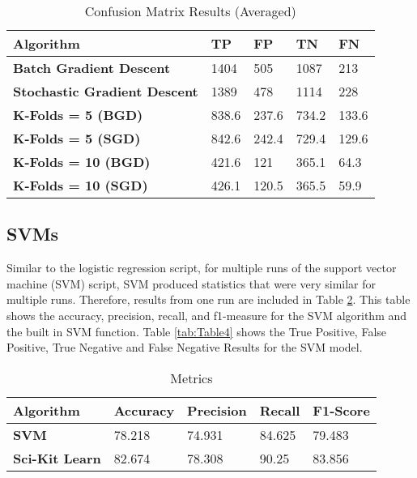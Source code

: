 \begin{table}[ht]
    \centering
    \begin{tabular}{|l|l|l|l|l|}
        \hline
        \textbf{Algorithm}                   & \textbf{TP} & \textbf{FP} & \textbf{TN} & \textbf{FN} \\
        \hline
        \textbf{Batch Gradient Descent}      & 1404        & 505         & 1087        & 213         \\
        \textbf{Stochastic Gradient Descent} & 1389        & 478         & 1114        & 228         \\
        \textbf{K-Folds = 5 (BGD)}           & 838.6       & 237.6       & 734.2       & 133.6       \\
        \textbf{K-Folds = 5 (SGD)}           & 842.6       & 242.4       & 729.4       & 129.6       \\
        \textbf{K-Folds = 10 (BGD)}          & 421.6       & 121         & 365.1       & 64.3        \\
        \textbf{K-Folds = 10 (SGD)}          & 426.1       & 120.5       & 365.5       & 59.9        \\
        \hline
    \end{tabular}
    \caption{Confusion Matrix Results (Averaged)}
    \label{tab:Table2}
\end{table}

\subsection{SVMs}
\label{sec:evaluation:SVMs}

Similar to the logistic regression script, for multiple runs of the support vector machine (SVM) script, SVM produced statistics that were very similar for multiple runs. Therefore, results from one run are included in Table \ref{tab:Table3}. This table shows the accuracy, precision, recall, and f1-measure for the SVM algorithm and the built in SVM function. Table \ref{tab:Table4} shows the True Positive, False Positive, True Negative and False Negative Results for the SVM model.

\begin{table}[ht]
    \centering
    \begin{tabular}{|l|l|l|l|l|}
        \hline
        \textbf{Algorithm}     & \textbf{Accuracy} & \textbf{Precision} & \textbf{Recall} & \textbf{F1-Score} \\
        \hline
        \textbf{SVM}           & 78.218            & 74.931             & 84.625          & 79.483            \\
        \textbf{Sci-Kit Learn} & 82.674            & 78.308             & 90.25           & 83.856            \\
        \hline
    \end{tabular}
    \caption{Metrics}
    \label{tab:Table3}
\end{table}

